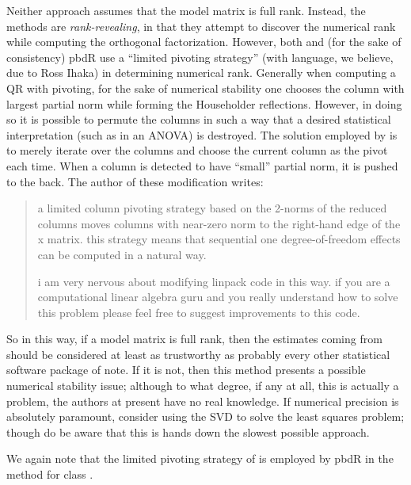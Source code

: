Neither approach assumes that the model matrix is full rank.  Instead, the methods are \emph{rank-revealing}, in that they attempt to discover the numerical rank while computing the orthogonal factorization.  However, both  and (for the sake of consistency) pbdR use a ``limited pivoting strategy'' (with language, we believe, due to Ross Ihaka) in determining numerical rank.  Generally when computing a QR with pivoting, for the sake of numerical stability one chooses the column with largest partial norm while forming the Householder reflections.  However, in doing so it is possible to permute the columns in such a way that a desired statistical interpretation (such as in an ANOVA) is destroyed.  The solution employed by  is to merely iterate over the columns and choose the current column as the pivot each time.  When a column is detected to have ``small'' partial norm, it is pushed to the back.  The author of these modification writes:
\begin{quote}
     a limited column pivoting strategy based on the 2-norms 
     of the reduced columns moves columns with near-zero norm to the 
     right-hand edge of the x matrix.  this strategy means that 
     sequential one degree-of-freedom effects can be computed in a 
     natural way.

     i am very nervous about modifying linpack code in this way.
     if you are a computational linear algebra guru and you really
     understand how to solve this problem please feel free to
     suggest improvements to this code.
\end{quote}
So in this way, if a model matrix is full rank, then the estimates coming from  should be considered at least as trustworthy as probably every other statistical software package of note.  If it is not, then this method presents a possible numerical stability issue; although to what degree, if any at all, this is actually a problem, the authors at present have no real knowledge.  If numerical precision is absolutely paramount, consider using the SVD to solve the least squares problem; though do be aware that this is hands down the slowest possible approach.

We again note that the limited pivoting strategy of  is employed by pbdR in the  method for class .